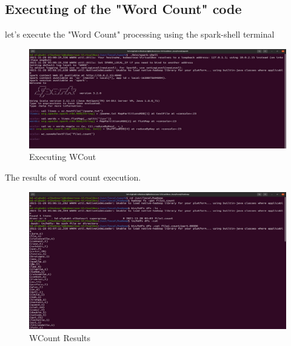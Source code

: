 \begin{spacing}{1.2}
\section{Executing of the "Word Count" code}

\par let's execute the "Word Count" processing using the spark-shell terminal
\\
\begin{figure}[!htb] 
\begin{center} 
\includegraphics[width=1\linewidth]{Big_Data/Spark/Executing WCount using scala/Executing WCout} 
\end{center} 
\caption{Executing WCout} 
\end{figure} 
\FloatBarrier



\par The results of word count execution.
\\
\begin{figure}[!htb] 
\begin{center} 
\includegraphics[width=1\linewidth]{Big_Data/Spark/Executing WCount using scala/WCount Results} 
\end{center} 
\caption{WCount Results} 
\end{figure} 
\FloatBarrier




\end{spacing}

